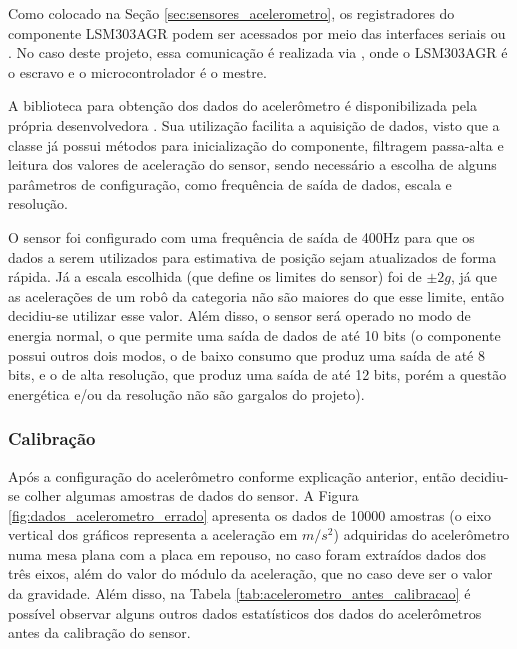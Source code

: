 \documentclass[acronym, symbols, table]{fei}
\begin{document}
				Como colocado na Seção \ref{sec:sensores_acelerometro}, os registradores do componente LSM303AGR podem ser acessados por meio das interfaces seriais  ou . No caso deste projeto, essa comunicação é realizada via , onde o LSM303AGR é o escravo e o microcontrolador é o mestre.
				
				A biblioteca para obtenção dos dados do acelerômetro é disponibilizada pela própria desenvolvedora \cite{accelero_repository}. Sua utilização facilita a aquisição de dados, visto que a classe já possui métodos para inicialização do componente, filtragem passa-alta e leitura dos valores de aceleração do sensor, sendo necessário a escolha de alguns parâmetros de configuração, como frequência de saída de dados, escala e resolução.
				
				O sensor foi configurado com uma frequência de saída de 400Hz para que os dados a serem utilizados para estimativa de posição sejam atualizados de forma rápida. Já a escala escolhida (que define os limites do sensor) foi de $\pm2g$, já que as acelerações de um robô da categoria  não são maiores do que esse limite, então decidiu-se utilizar esse valor. Além disso, o sensor será operado no modo de energia normal, o que permite uma saída de dados de até 10 bits (o componente possui outros dois modos, o de baixo consumo que produz uma saída de até 8 bits, e o de alta resolução, que produz uma saída de até 12 bits, porém a questão energética e/ou da resolução não são gargalos do projeto).
				
				\subsubsection{Calibração}
					
					Após a configuração do acelerômetro conforme explicação anterior, então decidiu-se colher algumas amostras de dados do sensor. A Figura \ref{fig:dados_acelerometro_errado} apresenta os dados de 10000 amostras (o eixo vertical dos gráficos representa a aceleração em $m/s^2$) adquiridas do acelerômetro numa mesa plana com a placa em repouso, no caso foram extraídos dados dos três eixos, além do valor do módulo da aceleração, que no caso deve ser o valor da gravidade. Além disso, na Tabela \ref{tab:acelerometro_antes_calibracao} é possível observar alguns outros dados estatísticos dos dados do acelerômetros antes da calibração do sensor.
					
\end{document}
